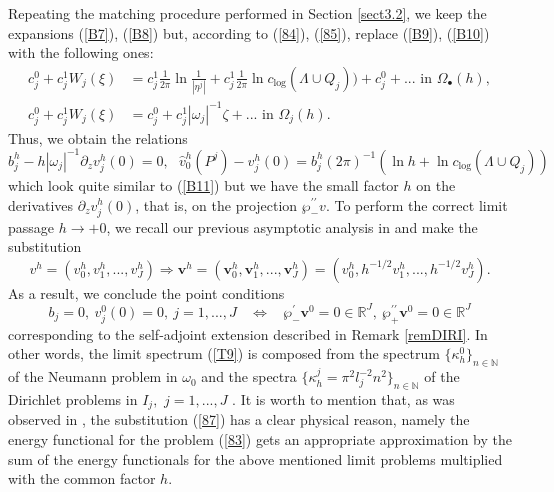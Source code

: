 \documentclass[11pt]{article}%
\numberwithin{equation}{section}
\begin{document}
Repeating the matching procedure performed in Section \ref{sect3.2}, we keep
the expansions (\ref{B7}), (\ref{B8}) but, according to (\ref{84}),
(\ref{85}), replace (\ref{B9}), (\ref{B10}) with the following ones:%
\begin{align*}
c_{j}^{0}+c_{j}^{1}W_{j}(\xi)  &  =c_{j}^{1}\frac{1}{2\pi}\ln\frac{1}%
{|\eta^{j}|}+c_{j}^{1}\frac{1}{2\pi}\ln c_{\log}(\Lambda\cup Q_{j}))+c_{j}%
^{0}+...\text{ \ \ in }\Omega_{\bullet}(h),\\
c_{j}^{0}+c_{j}^{1}W_{j}(\xi)  &  =c_{j}^{0}+c_{j}^{1}|\omega_{j}|^{-1}%
\zeta+...\text{ \ \ in }\Omega_{j}(h).
\end{align*}
Thus, we obtain the relations%
\begin{equation}
b_{j}^{h}-h|\omega_{j}|^{-1}\partial_{z}v_{j}^{h}(0)=0,\ \ \ \widehat{v}%
_{0}^{h}(P^{j})-v_{j}^{h}(0)=b_{j}^{h}(2\pi)^{-1}(\ln h+\ln c_{\log}%
(\Lambda\cup Q_{j})) \label{86}%
\end{equation}
which look quite similar to (\ref{B11}) but we have the small factor $h$ on
the derivatives $\partial_{z}v_{j}^{h}(0)$, that is, on the projection
$\wp_{-}^{\prime\prime}v$. To perform the correct limit passage $h\rightarrow
+0$, we recall our previous asymptotic analysis in \cite[Sect. 2]{BuCaNa1} and
make the substitution%
\begin{equation}
v^{h}=(v_{0}^{h},v_{1}^{h},...,v_{J}^{h})\Rightarrow\mathbf{v}^{h}%
=(\mathbf{v}_{0}^{h},\mathbf{v}_{1}^{h},...,\mathbf{v}_{J}^{h})=(v_{0}%
^{h},h^{-1/2}v_{1}^{h},...,h^{-1/2}v_{J}^{h}). \label{87}%
\end{equation}
As a result, we conclude the point conditions%
\begin{equation}
b_{j}=0,\ v_{j}^{0}(0)=0,\ j=1,...,J\ \ \ \ \Leftrightarrow\ \ \ \ \wp
_{-}^{\prime}\mathbf{v}^{0}=0\in\mathbb{R}^{J},\ \wp_{+}^{\prime\prime
}\mathbf{v}^{0}=0\in\mathbb{R}^{J} \label{88}%
\end{equation}
corresponding to the self-adjoint extension described in Remark \ref{remDIRI}.
In other words, the limit spectrum (\ref{T9}) is composed from the spectrum
$\{\kappa_{h}^{0}\}_{n\in\mathbb{N}}$ of the Neumann problem in $\omega_{0}$
and the spectra $\{\kappa_{h}^{j}=\pi^{2}l_{j}^{-2}n^{2}\}_{n\in\mathbb{N}}$
of the Dirichlet problems in $I_{j},$ $j=1,...,J$ . It is worth to mention
that, as was observed in \cite{BuCaNa1}, the substitution (\ref{87}) has a
clear physical reason, namely the energy functional for the problem (\ref{83})
gets an appropriate approximation by the sum of the energy functionals for the
above mentioned limit problems multiplied with the common factor $h$.
\end{document}

